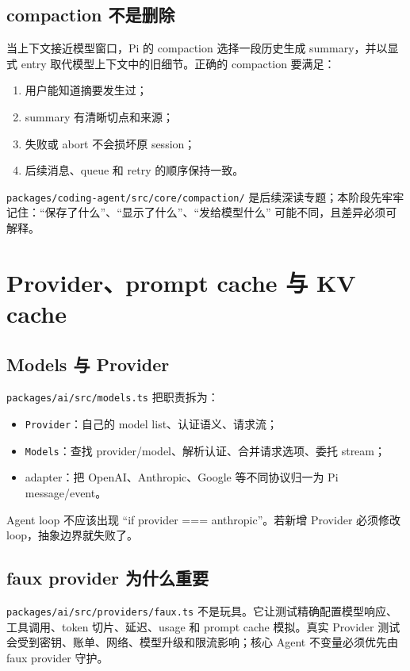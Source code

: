 \documentclass[UTF8,openany,11pt]{ctexbook}
\newcommand{\pathref}[1]{\texttt{#1}}
\begin{document}
\section{compaction 不是删除}
当上下文接近模型窗口，Pi 的 compaction 选择一段历史生成 summary，并以显式 entry 取代模型上下文中的旧细节。正确的 compaction 要满足：
\begin{enumerate}
\item 用户能知道摘要发生过；
\item summary 有清晰切点和来源；
\item 失败或 abort 不会损坏原 session；
\item 后续消息、queue 和 retry 的顺序保持一致。
\end{enumerate}
\pathref{packages/coding-agent/src/core/compaction/} 是后续深读专题；本阶段先牢牢记住：``保存了什么''、``显示了什么''、``发给模型什么'' 可能不同，且差异必须可解释。

\chapter{Provider、prompt cache 与 KV cache}

\section{Models 与 Provider}
\pathref{packages/ai/src/models.ts} 把职责拆为：
\begin{itemize}
\item \texttt{Provider}：自己的 model list、认证语义、请求流；
\item \texttt{Models}：查找 provider/model、解析认证、合并请求选项、委托 stream；
\item adapter：把 OpenAI、Anthropic、Google 等不同协议归一为 Pi message/event。
\end{itemize}
Agent loop 不应该出现 ``if provider === anthropic''。若新增 Provider 必须修改 loop，抽象边界就失败了。

\section{faux provider 为什么重要}
\pathref{packages/ai/src/providers/faux.ts} 不是玩具。它让测试精确配置模型响应、工具调用、token 切片、延迟、usage 和 prompt cache 模拟。真实 Provider 测试会受到密钥、账单、网络、模型升级和限流影响；核心 Agent 不变量必须优先由 faux provider 守护。
\end{document}
